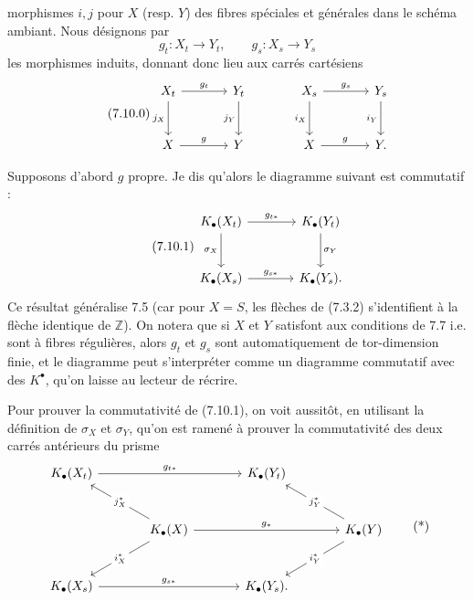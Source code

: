 morphismes \(i,j\) pour \(X\) (resp. \(Y\)) des fibres spéciales et générales dans le schéma ambiant. Nous désignons par
\[
  g_t:X_t\to Y_t,\qquad g_s:X_s\to Y_s
\]
les morphismes induits, donnant donc lieu aux carrés cartésiens
\begin{equation}\tag{7.10.0}
\begin{tikzcd}[column sep=large,row sep=large]
X_t \arrow[r,"g_t"] \arrow[d,"j_X"'] & Y_t \arrow[d,"j_Y"'] &
X_s \arrow[r,"g_s"] \arrow[d,"i_X"'] & Y_s \arrow[d,"i_Y"']\\
X \arrow[r,"g"] & Y &
X \arrow[r,"g"] & Y .
\end{tikzcd}
\end{equation}

Supposons d'abord \(g\) propre. Je dis qu'alors le diagramme suivant est commutatif :
\begin{equation}\tag{7.10.1}
\begin{tikzcd}[column sep=large,row sep=large]
K_\bullet(X_t) \arrow[r,"g_{t*}"] \arrow[d,"\sigma_X"'] &
K_\bullet(Y_t) \arrow[d,"\sigma_Y"]\\
K_\bullet(X_s) \arrow[r,"g_{s*}"] &
K_\bullet(Y_s).
\end{tikzcd}
\end{equation}
Ce résultat généralise 7.5 (car pour \(X=S\), les flèches de (7.3.2) s'identifient à la flèche identique de \(\mathbb Z\)). On notera que si \(X\) et \(Y\) satisfont aux conditions de 7.7 i.e. sont à fibres régulières, alors \(g_t\) et \(g_s\) sont automatiquement de tor-dimension finie, et le diagramme peut s'interpréter comme un diagramme commutatif avec des \(K^\bullet\), qu'on laisse au lecteur de récrire.

Pour prouver la commutativité de (7.10.1), on voit aussitôt, en utilisant la définition de \(\sigma_X\) et \(\sigma_Y\), qu'on est ramené à prouver la commutativité des deux carrés antérieurs du prisme
\[
\begin{tikzcd}[column sep=large,row sep=large]
K_\bullet(X_t) \arrow[rr,"g_{t*}"] && K_\bullet(Y_t)\\
& K_\bullet(X) \arrow[ul,"j_X^*" description] \arrow[dl,"i_X^*" description] \arrow[rr,"g_*"] &&
K_\bullet(Y) \arrow[ul,"j_Y^*" description] \arrow[dl,"i_Y^*" description]\\
K_\bullet(X_s) \arrow[rr,"g_{s*}"] && K_\bullet(Y_s).
\end{tikzcd}
\tag{*}
\]

